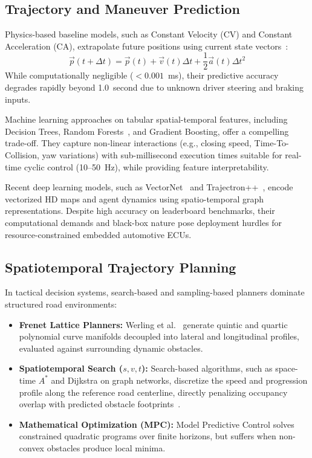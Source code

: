 \documentclass[runningheads]{llncs}
\begin{document}
\subsection{Trajectory and Maneuver Prediction}
Physics-based baseline models, such as Constant Velocity (CV) and Constant Acceleration (CA), extrapolate future positions using current state vectors~\cite{paden2016survey}:
\begin{equation}
\vec{p}(t + \Delta t) = \vec{p}(t) + \vec{v}(t)\Delta t + \frac{1}{2}\vec{a}(t)\Delta t^2
\end{equation}
While computationally negligible ($<0.001$~ms), their predictive accuracy degrades rapidly beyond 1.0~second due to unknown driver steering and braking inputs.

Machine learning approaches on tabular spatial-temporal features, including Decision Trees, Random Forests~\cite{breiman2001random}, and Gradient Boosting, offer a compelling trade-off. They capture non-linear interactions (e.g., closing speed, Time-To-Collision, yaw variations) with sub-millisecond execution times suitable for real-time cyclic control (10--50~Hz), while providing feature interpretability.

Recent deep learning models, such as VectorNet~\cite{gao2020vectornet} and Trajectron++~\cite{salzmann2020trajectron++}, encode vectorized HD maps and agent dynamics using spatio-temporal graph representations. Despite high accuracy on leaderboard benchmarks, their computational demands and black-box nature pose deployment hurdles for resource-constrained embedded automotive ECUs.

\subsection{Spatiotemporal Trajectory Planning}
In tactical decision systems, search-based and sampling-based planners dominate structured road environments:
\begin{itemize}
    \item \textbf{Frenet Lattice Planners:} Werling et al.~\cite{werling2010optimal} generate quintic and quartic polynomial curve manifolds decoupled into lateral and longitudinal profiles, evaluated against surrounding dynamic obstacles.
    \item \textbf{Spatiotemporal Search ($s, v, t$):} Search-based algorithms, such as space-time $A^*$ and Dijkstra on graph networks, discretize the speed and progression profile along the reference road centerline, directly penalizing occupancy overlap with predicted obstacle footprints~\cite{lavalle2006planning}.
    \item \textbf{Mathematical Optimization (MPC):} Model Predictive Control solves constrained quadratic programs over finite horizons, but suffers when non-convex obstacles produce local minima.
\end{itemize}
\end{document}
